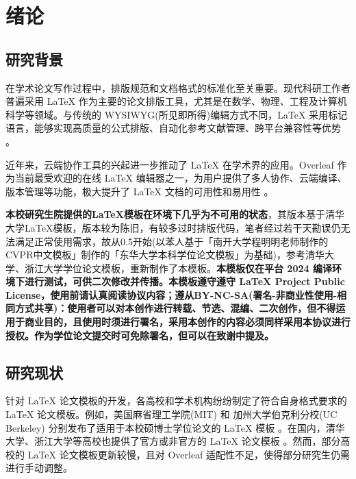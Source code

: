 \chapter{绪论}
\label{cha:intro}
\section{研究背景}
在学术论文写作过程中，排版规范和文档格式的标准化至关重要。现代科研工作者普遍采用 \LaTeX{} 作为主要的论文排版工具，尤其是在数学、物理、工程及计算机科学等领域。与传统的 WYSIWYG(所见即所得)编辑方式不同，\LaTeX{} 采用标记语言，能够实现高质量的公式排版、自动化参考文献管理、跨平台兼容性等优势 \cite{Lam1986LATEXDocument}。

近年来，云端协作工具的兴起进一步推动了 \LaTeX{} 在学术界的应用。Overleaf 作为当前最受欢迎的在线 \LaTeX{} 编辑器之一，为用户提供了多人协作、云端编译、版本管理等功能，极大提升了 \LaTeX{} 文档的可用性和易用性 \cite{OveOverleafZaiXianDeLaT}。

\textbf{本校研究生院提供的\LaTeX{}模板\cite{BeiJingJiao2014BeiJingJiaoTongDaXueBoShiShuoShiXueWeiLunWen}在\overleaf{}环境下几乎为不可用的状态}，其版本基于清华大学\LaTeX{}模板，版本较为陈旧，有较多过时排版代码，笔者经过若干天勘误仍无法满足正常使用需求，故从0.5开始(以苯人基于「南开大学程明明老师制作的CVPR中文模板\cite{ChengMingMing2016ZhongWenMoBanMyCVPR}」制作的「东华大学本科学位论文模板」为基础)，参考清华大学、浙江大学学位论文\cite{TUN2025LaTeXThesisTe, Wan2025ZheJiangDaXueXueWeiLunWenLaTeX}模板，重新制作了本模板。\textbf{本模板仅在\overleaf{}平台\XeTeX{} 2024 编译环境下进行测试，可供二次修改并传播。本模板遵守遵守 \LaTeX{} Project Public License，使用前请认真阅读协议内容；遵从BY-NC-SA(署名-非商业性使用-相同方式共享)：使用者可以对本创作进行转载、节选、混编、二次创作，但不得运用于商业目的，且使用时须进行署名，采用本创作的内容必须同样采用本协议进行授权。作为学位论文提交时可免除署名，但可以在致谢中提及。}

\section{研究现状}
针对 \LaTeX{} 论文模板的开发，各高校和学术机构纷纷制定了符合自身格式要求的 \LaTeX{} 论文模板。例如，美国麻省理工学院(MIT) 和 加州大学伯克利分校(UC Berkeley) 分别发布了适用于本校硕博士学位论文的 \LaTeX{} 模板 \cite{MasMITthesistemp, PauPreparingYour}。在国内，清华大学、浙江大学等高校也提供了官方或非官方的 \LaTeX{} 论文模板 \cite{TUN2025LaTeXThesisTe, Wan2025ZheJiangDaXueXueWeiLunWenLaTeX}。然而，部分高校的 \LaTeX{} 论文模板更新较慢，且对 Overleaf 适配性不足，使得部分研究生仍需进行手动调整。

